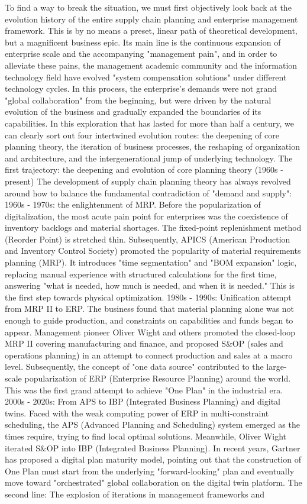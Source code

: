 \documentclass[11pt,a4paper]{article}
\begin{document}
To find a way to break the situation, we must first objectively look back at the evolution history of the entire supply chain planning and enterprise management framework. This is by no means a preset, linear path of theoretical development, but a magnificent business epic. Its main line is the continuous expansion of enterprise scale and the accompanying "management pain", and in order to alleviate these pains, the management academic community and the information technology field have evolved "system compensation solutions" under different technology cycles. In this process, the enterprise's demands were not grand "global collaboration" from the beginning, but were driven by the natural evolution of the business and gradually expanded the boundaries of its capabilities. In this exploration that has lasted for more than half a century, we can clearly sort out four intertwined evolution routes: the deepening of core planning theory, the iteration of business processes, the reshaping of organization and architecture, and the intergenerational jump of underlying technology. The first trajectory: the deepening and evolution of core planning theory (1960s - present) The development of supply chain planning theory has always revolved around how to balance the fundamental contradiction of "demand and supply": 1960s - 1970s: the enlightenment of MRP. Before the popularization of digitalization, the most acute pain point for enterprises was the coexistence of inventory backlogs and material shortages. The fixed-point replenishment method (Reorder Point) is stretched thin. Subsequently, APICS (American Production and Inventory Control Society) promoted the popularity of material requirements planning (MRP). It introduces "time segmentation" and "BOM expansion" logic, replacing manual experience with structured calculations for the first time, answering "what is needed, how much is needed, and when it is needed." This is the first step towards physical optimization. 1980s - 1990s: Unification attempt from MRP II to ERP. The business found that material planning alone was not enough to guide production, and constraints on capabilities and funds began to appear. Management pioneer Oliver Wight and others promoted the closed-loop MRP II covering manufacturing and finance, and proposed S\&OP (sales and operations planning) in an attempt to connect production and sales at a macro level. Subsequently, the concept of "one data source" contributed to the large-scale popularization of ERP (Enterprise Resource Planning) around the world. This was the first grand attempt to achieve "One Plan" in the industrial era. 2000s - 2020s: From APS to IBP (Integrated Business Planning) and digital twins. Faced with the weak computing power of ERP in multi-constraint scheduling, the APS (Advanced Planning and Scheduling) system emerged as the times require, trying to find local optimal solutions. Meanwhile, Oliver Wight iterated S\&OP into IBP (Integrated Business Planning). In recent years, Gartner has proposed a digital plan maturity model, pointing out that the construction of One Plan must start from the underlying "forward-looking" plan and eventually move toward "orchestrated" global collaboration on the digital twin platform. The second line: The explosion of iterations in management frameworks and 
\end{document}
